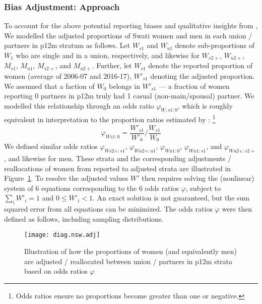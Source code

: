 \subsubsection{Bias Adjustment: Approach}\label{mod.par.wp.appr}
To account for the above potential reporting biases
and qualitative insights from \cite{Ruark2014,Fielding-Miller2016,Ruark2019,Pulerwitz2021},
We modelled the adjusted proportions of Swati women and men
in each union / partners in p12m stratum as follows.
Let $W_{s1}$ and $W_{u1}$ denote sub-proportions of $W_{1}$ who are single and in a union, respectively,
and likewise for $W_{s2+}$, $W_{u2+}$, $M_{s1}$, $M_{u1}$, $M_{s2+}$, and $M_{u2+}$.
Further, let $W_{s1}$ denote the reported proportion of women (average of 2006-07 and 2016-17),
\vs $W'_{s1}$ denoting the adjusted proportion.
We assumed that a faction of $W_{0}$ belongs in $W'_{s1}$
--- \ie a fraction of women reporting 0 partners in p12m truly had 1 casual (non-main/spousal) partner.
We modelled this relationship through an odds ratio $\varphi_{W,s1:0}$,
which is roughly equivalent in interpretation to
the proportion ratios estimated by \citet{Behanzin2013}:%
\footnote{Odds ratios ensure no proportions become greater than one or negative.}
\begin{equation}\label{eq:wp.or}
  \varphi_{Ws1:0} = \frac{W'_{s1}}{W'_{0}} \bigg/ \frac{W_{s1}}{W_{0}}
\end{equation}
We defined similar odds ratios $\varphi_{Ws2+:s1}$, $\varphi_{Wu2+:u1}$,
$\varphi_{Wu1:0}$, $\varphi_{Wu1:s1}$, and $\varphi_{Wu2+:s2+}$, and likewise for men.
These strata and the corresponding adjustments / reallocations of women
from reported to adjusted strata are illustrated in Figure~\ref{fig:model.nsw.adj}.
To resolve the adjusted values $W'$ then requires
solving the (nonlinear) system of 6 equations corresponding to the 6 odds ratios $\varphi$,
subject to $\sum_i W'_i = 1$ and $0 \le W'_i < 1$.
An exact solution is not guaranteed,
but the sum squared error from all equations can be minimized.
The odds ratios $\varphi$ were then defined as follows, including sampling distributions.
\begin{figure}
  \centering
  \texttt{[image: diag.nsw.adj]}
  \caption{Illustration of how the proportions of women (and equivalently men)
    are adjusted / reallocated between union / partners in p12m strata
    based on odds ratios $\varphi$}
  \label{fig:model.nsw.adj}
\end{figure}
